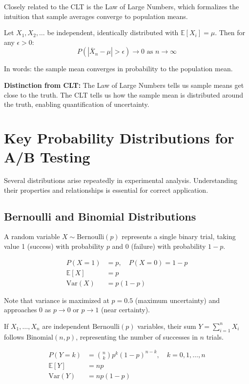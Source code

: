Closely related to the CLT is the Law of Large Numbers, which formalizes the intuition that sample averages converge to population means.

\begin{theorem}
Let $X_1, X_2, \ldots$ be independent, identically distributed with $\mathbb{E}[X_i] = \mu$. Then for any $\epsilon > 0$:
\begin{equation}
P(|\bar{X}_n - \mu| > \epsilon) \rightarrow 0 \text{ as } n \rightarrow \infty
\end{equation}

In words: the sample mean converges in probability to the population mean.
\end{theorem}

\textbf{Distinction from CLT:} The Law of Large Numbers tells us sample means get close to the truth. The CLT tells us how the sample mean is distributed around the truth, enabling quantification of uncertainty.

\section{Key Probability Distributions for A/B Testing}

Several distributions arise repeatedly in experimental analysis. Understanding their properties and relationships is essential for correct application.

\subsection{Bernoulli and Binomial Distributions}

\begin{definition}
A random variable $X \sim \text{Bernoulli}(p)$ represents a single binary trial, taking value 1 (success) with probability $p$ and 0 (failure) with probability $1-p$.

\begin{align}
P(X = 1) &= p, \quad P(X = 0) = 1-p \\
\mathbb{E}[X] &= p \\
\text{Var}(X) &= p(1-p)
\end{align}
\end{definition}

Note that variance is maximized at $p = 0.5$ (maximum uncertainty) and approaches 0 as $p \to 0$ or $p \to 1$ (near certainty).

\begin{definition}
If $X_1, \ldots, X_n$ are independent $\text{Bernoulli}(p)$ variables, their sum $Y = \sum_{i=1}^n X_i$ follows $\text{Binomial}(n, p)$, representing the number of successes in $n$ trials.

\begin{align}
P(Y = k) &= \binom{n}{k} p^k (1-p)^{n-k}, \quad k = 0, 1, \ldots, n \\
\mathbb{E}[Y] &= np \\
\text{Var}(Y) &= np(1-p)
\end{align}
\end{definition}

